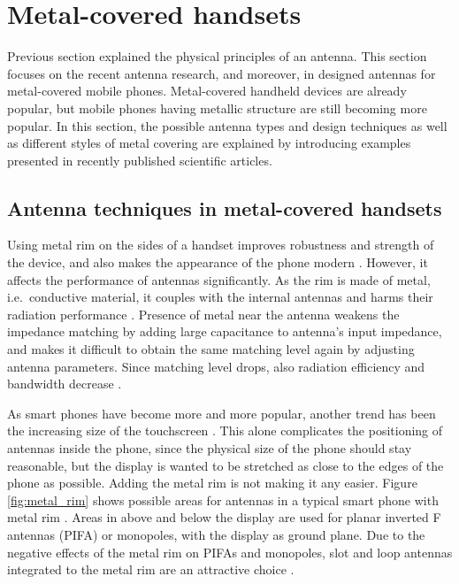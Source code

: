 \section{Metal-covered handsets}
\label{sec:metal_cover}
Previous section explained the physical principles of an antenna. This section focuses on the recent antenna research, and moreover, in designed antennas for metal-covered mobile phones. Metal-covered handheld devices are already popular, but mobile phones having metallic structure are still becoming more popular. In this section, the possible antenna types and design techniques as well as different styles of metal covering are explained by introducing examples presented in recently published scientific articles.

\subsection{Antenna techniques in metal-covered handsets}
\label{sec:metal_rim}
Using metal rim on the sides of a handset improves robustness and strength of the device, and also makes the appearance of the phone modern \cite{ban_dual_loop, hsu_compact, yuan_slot}. However, it affects the performance of antennas significantly. As the rim is made of metal, i.e.\ conductive material, it couples with the internal antennas and harms their radiation performance \cite{ban_dual_loop}. Presence of metal near the antenna weakens the impedance matching by adding large capacitance to antenna's input impedance, and makes it difficult to obtain the same matching level again by adjusting antenna parameters. Since matching level drops, also radiation efficiency and bandwidth decrease \cite{ban_dual_loop, hsu_compact, yuan_slot}.

As smart phones have become more and more popular, another trend has been the increasing size of the touchscreen \cite{ban_low_profile}. This alone complicates the positioning of antennas inside the phone, since the physical size of the phone should stay reasonable, but the display is wanted to be stretched as close to the edges of the phone as possible. Adding the metal rim is not making it any easier. Figure \ref{fig:metal_rim} shows possible areas for antennas in a typical smart phone with metal rim \cite{hsu_compact}. Areas in above and below the display are used for planar inverted F antennas (PIFA) or monopoles, with the display as ground plane. Due to the negative effects of the metal rim on PIFAs and monopoles, slot and loop antennas integrated to the metal rim are an attractive choice \cite{hsu_compact, ban_dual_loop}.

